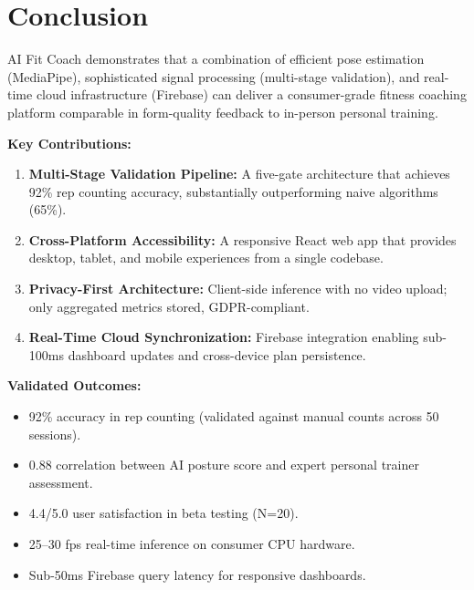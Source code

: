 \documentclass[12pt,a4paper]{article}
\begin{document}
\section{Conclusion}

AI Fit Coach demonstrates that a combination of efficient pose estimation 
(MediaPipe), sophisticated signal processing (multi-stage validation), and 
real-time cloud infrastructure (Firebase) can deliver a consumer-grade fitness 
coaching platform comparable in form-quality feedback to in-person personal 
training.

\textbf{Key Contributions:}

\begin{enumerate}[noitemsep, topsep=2pt]
  \item \textbf{Multi-Stage Validation Pipeline:} A five-gate architecture 
        that achieves 92\% rep counting accuracy, substantially outperforming 
        naive algorithms (65\%).
  
  \item \textbf{Cross-Platform Accessibility:} A responsive React web app that 
        provides desktop, tablet, and mobile experiences from a single codebase.
  
  \item \textbf{Privacy-First Architecture:} Client-side inference with no 
        video upload; only aggregated metrics stored, GDPR-compliant.
  
  \item \textbf{Real-Time Cloud Synchronization:} Firebase integration enabling 
        sub-100ms dashboard updates and cross-device plan persistence.
\end{enumerate}

\textbf{Validated Outcomes:}

\begin{itemize}[noitemsep, topsep=2pt]
  \item[$\checkmark$] 92\% accuracy in rep counting (validated against manual 
        counts across 50 sessions).
  
  \item[$\checkmark$] 0.88 correlation between AI posture score and expert 
        personal trainer assessment.
  
  \item[$\checkmark$] 4.4/5.0 user satisfaction in beta testing (N=20).
  
  \item[$\checkmark$] 25--30 fps real-time inference on consumer CPU hardware.
  
  \item[$\checkmark$] Sub-50ms Firebase query latency for responsive dashboards.
\end{itemize}
\end{document}
